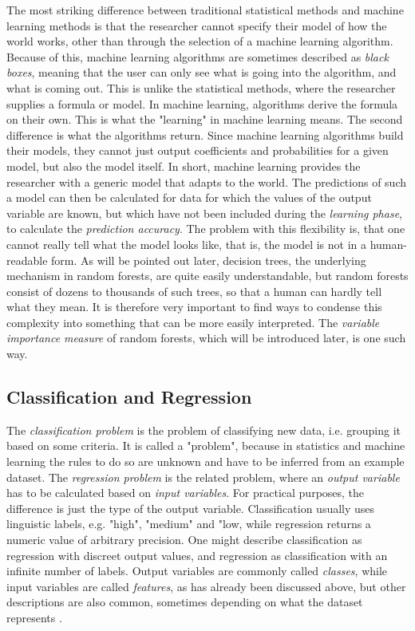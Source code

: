 \documentclass[a4paper,man,12pt,apacite,floatsintext,draftfirst]{apa6} %
\begin{document}
The most striking difference between traditional statistical methods and
machine learning methods is that the researcher cannot specify their model of
how the world works, other than through the selection of a machine learning
algorithm.
Because of this, machine learning algorithms are sometimes described as
\emph{black boxes}, meaning that the user can only see what is going into the
algorithm, and what is coming out.
This is unlike the statistical methods, where the researcher supplies a
formula or model.
In machine learning, algorithms derive the formula on their own.
This is what the "learning" in machine learning means.
The second difference is what the algorithms return.
Since machine learning algorithms build their models,
they cannot just output coefficients and probabilities for a given model,
but also the model itself.
In short, machine learning provides the researcher with a generic model
that adapts to the world.
The predictions of such a model can then be calculated for data for which
the values of the output variable are known, but which have not
been included during the \emph{learning phase},
to calculate the \emph{prediction accuracy}.
The problem with this flexibility is, that one cannot really tell what the
model looks like, that is, the model is not in a human-readable form.
As will be pointed out later, decision trees, the underlying mechanism in
random forests, are quite easily understandable, but random forests
consist of dozens to thousands of such trees, so that a human can hardly
tell what they mean.
It is therefore very important to find ways to condense this complexity
into something that can be more easily interpreted.
The \emph{variable importance measure} of random forests, which will be introduced
later, is one such way.

\subsection{Classification and Regression}
The \emph{classification problem} is the problem of classifying new data,
i.e. grouping it based on some criteria.
It is called a "problem", because in statistics and machine learning the
rules to do so are unknown and have to be inferred from an example dataset.
The \emph{regression problem} is the related problem, where an
\emph{output variable} has to be calculated based on \emph{input variables}.
For practical purposes, the difference is just the type of the output variable.
Classification usually uses linguistic labels, e.g. "high", "medium" and "low,
while regression returns a numeric value of arbitrary precision.
One might describe classification as regression with discreet output values,
and regression as classification with an infinite number of labels.
Output variables are commonly called \emph{classes}, while input variables
are called \emph{features}, as has already been discussed above, but
other descriptions are also common, sometimes depending on what the dataset
represents \cite{strobl2009introduction}.
\end{document}

